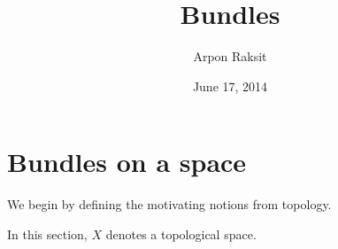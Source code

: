 

\newcommand{\aut}{\operatorname{aut}}
\newcommand{\saut}{\operatorname{\underline{aut}}}
\newcommand{\Bun}{\operatorname{Bun}}
\newcommand{\Cat}{\operatorname{Cat}}
\newcommand{\Gpd}{\operatorname{Gpd}}
\newcommand{\Grp}{\operatorname{Grp}}
\newcommand{\E}{\mathcal{E}}
\newcommand{\F}{\mathcal{F}}
\newcommand{\G}{\mathcal{G}}
\renewcommand{\H}{\mathcal{H}}
\newcommand{\X}{\mathcal{X}}
\newcommand{\Y}{\mathcal{Y}}


\title{Bundles}
\author{Arpon Raksit}
\date{June 17, 2014}


\maketitle


\section{Bundles on a space}

We begin by defining the motivating notions from topology.

\begin{notation}
  In this section, $X$ denotes a topological space.
\end{notation}

